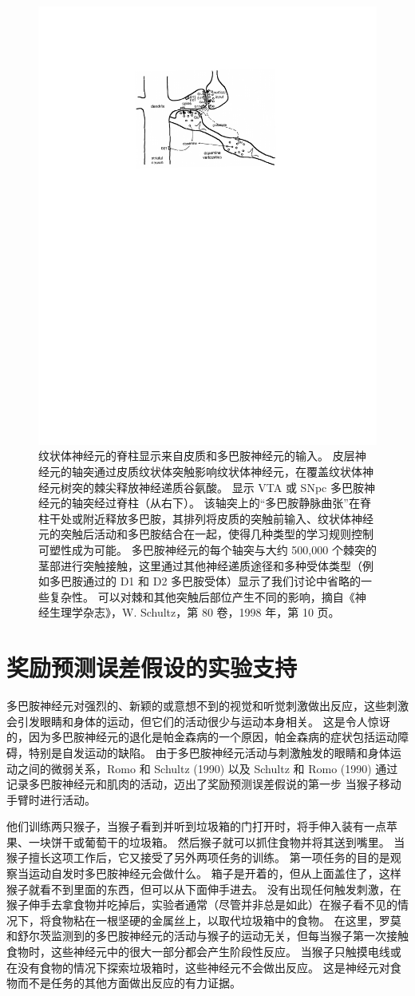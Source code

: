 \begin{figure}[!htb]
	\centering
	\includegraphics[width=0.5\linewidth]{chap12/fig_12_2}
	\caption{纹状体神经元的脊柱显示来自皮质和多巴胺神经元的输入。
		皮层神经元的轴突通过皮质纹状体突触影响纹状体神经元，在覆盖纹状体神经元树突的棘尖释放神经递质谷氨酸。
		显示 VTA 或 SNpc 多巴胺神经元的轴突经过脊柱（从右下）。
		该轴突上的“多巴胺静脉曲张”在脊柱干处或附近释放多巴胺，其排列将皮质的突触前输入、纹状体神经元的突触后活动和多巴胺结合在一起，使得几种类型的学习规则控制可塑性成为可能。
		多巴胺神经元的每个轴突与大约 500,000 个棘突的茎部进行突触接触，这里通过其他神经递质途径和多种受体类型（例如多巴胺通过的 D1 和 D2 多巴胺受体）显示了我们讨论中省略的一些复杂性。
		可以对棘和其他突触后部位产生不同的影响，摘自《神经生理学杂志》，W. Schultz，第 80 卷，1998 年，第 10 页。
		\label{fig:12_2}}
\end{figure}



\section{奖励预测误差假设的实验支持} \label{sec:experimental_support}

多巴胺神经元对强烈的、新颖的或意想不到的视觉和听觉刺激做出反应，这些刺激会引发眼睛和身体的运动，但它们的活动很少与运动本身相关。
这是令人惊讶的，因为多巴胺神经元的退化是帕金森病的一个原因，帕金森病的症状包括运动障碍，特别是自发运动的缺陷。
由于多巴胺神经元活动与刺激触发的眼睛和身体运动之间的微弱关系，Romo 和 Schultz (1990) 以及 Schultz 和 Romo (1990) 通过记录多巴胺神经元和肌肉的活动，迈出了奖励预测误差假说的第一步 当猴子移动手臂时进行活动。


他们训练两只猴子，当猴子看到并听到垃圾箱的门打开时，将手伸入装有一点苹果、一块饼干或葡萄干的垃圾箱。
然后猴子就可以抓住食物并将其送到嘴里。
当猴子擅长这项工作后，它又接受了另外两项任务的训练。
第一项任务的目的是观察当运动自发时多巴胺神经元会做什么。
箱子是开着的，但从上面盖住了，这样猴子就看不到里面的东西，但可以从下面伸手进去。
没有出现任何触发刺激，在猴子伸手去拿食物并吃掉后，实验者通常（尽管并非总是如此）在猴子看不见的情况下，将食物粘在一根坚硬的金属丝上，以取代垃圾箱中的食物。
在这里，罗莫和舒尔茨监测到的多巴胺神经元的活动与猴子的运动无关，但每当猴子第一次接触食物时，这些神经元中的很大一部分都会产生阶段性反应。
当猴子只触摸电线或在没有食物的情况下探索垃圾箱时，这些神经元不会做出反应。
这是神经元对食物而不是任务的其他方面做出反应的有力证据。


